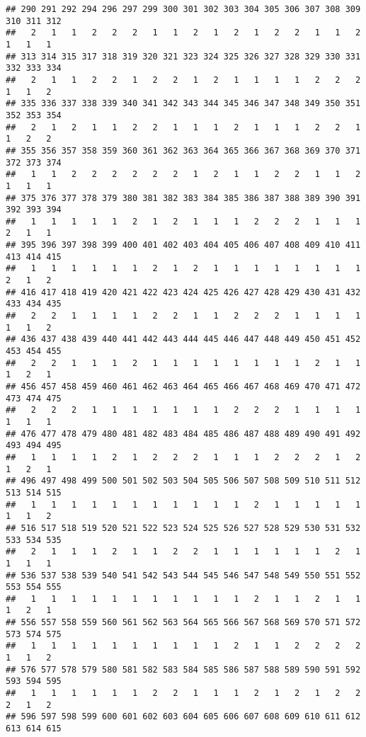 \documentclass[]{article}
\begin{document}
\begin{verbatim}
## 290 291 292 294 296 297 299 300 301 302 303 304 305 306 307 308 309 310 311 312 
##   2   1   1   2   2   2   1   1   2   1   2   1   2   2   1   1   2   1   1   1 
## 313 314 315 317 318 319 320 321 323 324 325 326 327 328 329 330 331 332 333 334 
##   2   1   1   2   2   1   2   2   1   2   1   1   1   1   2   2   2   1   1   2 
## 335 336 337 338 339 340 341 342 343 344 345 346 347 348 349 350 351 352 353 354 
##   2   1   2   1   1   2   2   1   1   1   2   1   1   1   2   2   1   1   2   2 
## 355 356 357 358 359 360 361 362 363 364 365 366 367 368 369 370 371 372 373 374 
##   1   1   2   2   2   2   2   2   1   2   1   1   2   2   1   1   2   1   1   1 
## 375 376 377 378 379 380 381 382 383 384 385 386 387 388 389 390 391 392 393 394 
##   1   1   1   1   1   2   1   2   1   1   1   2   2   2   1   1   1   2   1   1 
## 395 396 397 398 399 400 401 402 403 404 405 406 407 408 409 410 411 413 414 415 
##   1   1   1   1   1   1   2   1   2   1   1   1   1   1   1   1   1   2   1   2 
## 416 417 418 419 420 421 422 423 424 425 426 427 428 429 430 431 432 433 434 435 
##   2   2   1   1   1   1   2   2   1   1   2   2   2   1   1   1   1   1   1   2 
## 436 437 438 439 440 441 442 443 444 445 446 447 448 449 450 451 452 453 454 455 
##   2   2   1   1   1   2   1   1   1   1   1   1   1   1   2   1   1   1   2   1 
## 456 457 458 459 460 461 462 463 464 465 466 467 468 469 470 471 472 473 474 475 
##   2   2   2   1   1   1   1   1   1   1   2   2   2   1   1   1   1   1   1   1 
## 476 477 478 479 480 481 482 483 484 485 486 487 488 489 490 491 492 493 494 495 
##   1   1   1   1   2   1   2   2   2   1   1   1   2   2   2   1   2   1   2   1 
## 496 497 498 499 500 501 502 503 504 505 506 507 508 509 510 511 512 513 514 515 
##   1   1   1   1   1   1   1   1   1   1   1   2   1   1   1   1   1   1   1   2 
## 516 517 518 519 520 521 522 523 524 525 526 527 528 529 530 531 532 533 534 535 
##   2   1   1   1   2   1   1   2   2   1   1   1   1   1   1   2   1   1   1   1 
## 536 537 538 539 540 541 542 543 544 545 546 547 548 549 550 551 552 553 554 555 
##   1   1   1   1   1   1   1   1   1   1   1   2   1   1   2   1   1   1   2   1 
## 556 557 558 559 560 561 562 563 564 565 566 567 568 569 570 571 572 573 574 575 
##   1   1   1   1   1   1   1   1   1   1   2   1   1   2   2   2   2   1   1   2 
## 576 577 578 579 580 581 582 583 584 585 586 587 588 589 590 591 592 593 594 595 
##   1   1   1   1   1   1   2   2   1   1   1   2   1   2   1   2   2   2   1   2 
## 596 597 598 599 600 601 602 603 604 605 606 607 608 609 610 611 612 613 614 615 

\end{verbatim}
\end{document}
